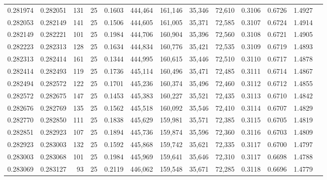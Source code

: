 \begin{tabular}{rrrrrrrrrrrrr}
0.281974 & 0.282051 &   131 &  25 &                                     0.1603 & 444,464 & 161,146 &  35,346 &  72,610 & 0.3106 & 0.6726 & 1.4927 \\
0.282053 & 0.282149 &   141 &  25 &                                     0.1506 & 444,605 & 161,005 &  35,371 &  72,585 & 0.3107 & 0.6724 & 1.4914 \\
0.282149 & 0.282221 &   101 &  25 &                                     0.1984 & 444,706 & 160,904 &  35,396 &  72,560 & 0.3108 & 0.6721 & 1.4905 \\
0.282223 & 0.282313 &   128 &  25 &                                     0.1634 & 444,834 & 160,776 &  35,421 &  72,535 & 0.3109 & 0.6719 & 1.4893 \\
0.282313 & 0.282414 &   161 &  25 &                                     0.1344 & 444,995 & 160,615 &  35,446 &  72,510 & 0.3110 & 0.6717 & 1.4878 \\
0.282414 & 0.282493 &   119 &  25 &                                     0.1736 & 445,114 & 160,496 &  35,471 &  72,485 & 0.3111 & 0.6714 & 1.4867 \\
0.282494 & 0.282572 &   122 &  25 &                                     0.1701 & 445,236 & 160,374 &  35,496 &  72,460 & 0.3112 & 0.6712 & 1.4855 \\
0.282572 & 0.282675 &   147 &  25 &                                     0.1453 & 445,383 & 160,227 &  35,521 &  72,435 & 0.3113 & 0.6710 & 1.4842 \\
0.282676 & 0.282769 &   135 &  25 &                                     0.1562 & 445,518 & 160,092 &  35,546 &  72,410 & 0.3114 & 0.6707 & 1.4829 \\
0.282770 & 0.282850 &   111 &  25 &                                     0.1838 & 445,629 & 159,981 &  35,571 &  72,385 & 0.3115 & 0.6705 & 1.4819 \\
0.282851 & 0.282923 &   107 &  25 &                                     0.1894 & 445,736 & 159,874 &  35,596 &  72,360 & 0.3116 & 0.6703 & 1.4809 \\
0.282923 & 0.283003 &   132 &  25 &                                     0.1592 & 445,868 & 159,742 &  35,621 &  72,335 & 0.3117 & 0.6700 & 1.4797 \\
0.283003 & 0.283068 &   101 &  25 &                                     0.1984 & 445,969 & 159,641 &  35,646 &  72,310 & 0.3117 & 0.6698 & 1.4788 \\
0.283069 & 0.283127 &    93 &  25 &                                     0.2119 & 446,062 & 159,548 &  35,671 &  72,285 & 0.3118 & 0.6696 & 1.4779 \\

\end{tabular}
